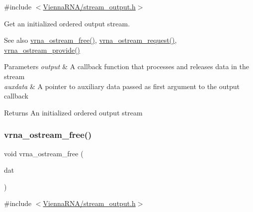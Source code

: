 {\ttfamily \#include $<$\mbox{\hyperlink{stream__output_8h}{Vienna\+R\+N\+A/stream\+\_\+output.\+h}}$>$}



Get an initialized ordered output stream. 

\begin{DoxySeeAlso}{See also}
\mbox{\hyperlink{group__buffer__utils_gaf813ec90e1446ba82c89f9a39688a3b3}{vrna\+\_\+ostream\+\_\+free()}}, \mbox{\hyperlink{group__buffer__utils_gaebca91932705d71bcbf00bd8d82bd7c8}{vrna\+\_\+ostream\+\_\+request()}}, \mbox{\hyperlink{group__buffer__utils_ga6253c42abdeaf3b41a38204865e1f0f7}{vrna\+\_\+ostream\+\_\+provide()}}
\end{DoxySeeAlso}

\begin{DoxyParams}{Parameters}
{\em output} & A callback function that processes and releases data in the stream \\
\hline
{\em auxdata} & A pointer to auxiliary data passed as first argument to the {\ttfamily output} callback \\
\hline
\end{DoxyParams}
\begin{DoxyReturn}{Returns}
An initialized ordered output stream 
\end{DoxyReturn}
\mbox{\label{group__buffer__utils_gaf813ec90e1446ba82c89f9a39688a3b3}} 
\subsubsection{\texorpdfstring{vrna\+\_\+ostream\+\_\+free()}{vrna\_ostream\_free()}}
{\footnotesize\ttfamily void vrna\+\_\+ostream\+\_\+free (\begin{DoxyParamCaption}\item[{\mbox{\hyperlink{group__buffer__utils_ga8da189552af21ab6e4e88bdcc240870c}{vrna\+\_\+ostream\+\_\+t}}}]{dat }\end{DoxyParamCaption})}



{\ttfamily \#include $<$\mbox{\hyperlink{stream__output_8h}{Vienna\+R\+N\+A/stream\+\_\+output.\+h}}$>$}



